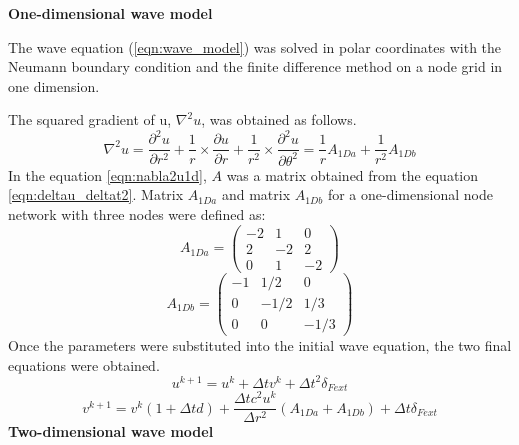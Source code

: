 \documentclass[12pt, a4paper]{article} %
\begin{document}
	\setlength{\parindent}{0pt}
	
	\setlength{\parskip}{8mm}
	
	\newpage
	
	\textbf{One-dimensional wave model}
	\normalsize 
	
	\setlength{\parskip}{0mm}
	
	The wave equation (\ref{eqn:wave_model}) was solved in polar coordinates with the Neumann boundary condition and the finite difference method on a node grid in one dimension. 
	
	\setlength{\parindent}{8pt}
	\setlength{\parskip}{4mm}
	
	The squared gradient of u, $\nabla^{2}u$, was obtained as follows.
	\begin{equation} \label{eqn:nabla2u1d}
		\nabla^{2}u = \frac{\partial^{2}u}{\partial r^{2}} + \frac{1}{r} \times \frac{\partial u}{\partial r} + \frac{1}{r^{2}} \times \frac{\partial ^{2} u}{\partial \theta^{2}} = \frac{1}{r} A_{1Da} + \frac{1}{r^{2}} A_{1Db}
	\end{equation}
	In the equation \ref{eqn:nabla2u1d}, $A$ was a matrix obtained from the equation \ref{eqn:deltau_deltat2}. Matrix $A_{1Da}$ and matrix $A_{1Db}$ for a one-dimensional node network with three nodes were defined as:
	\begin{equation} \label{eqn:matrixA_2Da}
		A_{1Da} = 
		\begin{pmatrix}
			-2 & 1 & 0\\
			2 & -2 & 2\\
			0 & 1 & -2
		\end{pmatrix}
	\end{equation}
	\begin{equation} \label{eqn:matrixA_2Db}
		A_{1Db} = 
		\begin{pmatrix}
			-1 & 1/2 & 0\\
			0 & -1/2 & 1/3\\
			0 & 0 & -1/3
		\end{pmatrix}
	\end{equation}
	Once the parameters were substituted into the initial wave equation, the two final equations were obtained.
	\begin{equation} \label{eqn:uk+1}
		u^{k + 1} = u^{k} + \Delta t v^{k} + \Delta t^{2} \delta_{Fext}
	\end{equation}
	\begin{equation} \label{eqn:vk+1}
		v^{k + 1} = v^{k}(1 + \Delta t d) + \frac{\Delta t c^{2} u^{k}}{\Delta r^{2}} (A_{1Da} + A_{1Db}) +  \Delta t \delta_{Fext}
	\end{equation}
	\setlength{\parindent}{0pt}
	\textbf{Two-dimensional wave model}
	
\end{document}

